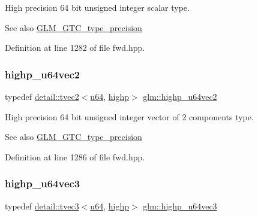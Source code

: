 High precision 64 bit unsigned integer scalar type. \begin{DoxySeeAlso}{See also}
\hyperlink{group__gtc__type__precision}{G\+L\+M\+\_\+\+G\+T\+C\+\_\+type\+\_\+precision} 
\end{DoxySeeAlso}


Definition at line 1282 of file fwd.\+hpp.

\mbox{\label{group__gtc__type__precision_gad11667a4764867732a89791ec2a01aeb}} 
\subsubsection{\texorpdfstring{highp\+\_\+u64vec2}{highp\_u64vec2}}
{\footnotesize\ttfamily typedef \hyperlink{structglm_1_1detail_1_1tvec2}{detail\+::tvec2}$<$\hyperlink{group__gtc__type__precision_ga71cedd4972f9cb1a5e14dfe5ab83ecd7}{u64}, \hyperlink{namespaceglm_a0f04f086094c747d227af4425893f545ac6f7eab42eacbb10d59a58e95e362074}{highp}$>$ \hyperlink{group__gtc__type__precision_gad11667a4764867732a89791ec2a01aeb}{glm\+::highp\+\_\+u64vec2}}

High precision 64 bit unsigned integer vector of 2 components type. \begin{DoxySeeAlso}{See also}
\hyperlink{group__gtc__type__precision}{G\+L\+M\+\_\+\+G\+T\+C\+\_\+type\+\_\+precision} 
\end{DoxySeeAlso}


Definition at line 1286 of file fwd.\+hpp.

\mbox{\label{group__gtc__type__precision_ga3cb5c038f8cba0dfb894af66b7b2ba13}} 
\subsubsection{\texorpdfstring{highp\+\_\+u64vec3}{highp\_u64vec3}}
{\footnotesize\ttfamily typedef \hyperlink{structglm_1_1detail_1_1tvec3}{detail\+::tvec3}$<$\hyperlink{group__gtc__type__precision_ga71cedd4972f9cb1a5e14dfe5ab83ecd7}{u64}, \hyperlink{namespaceglm_a0f04f086094c747d227af4425893f545ac6f7eab42eacbb10d59a58e95e362074}{highp}$>$ \hyperlink{group__gtc__type__precision_ga3cb5c038f8cba0dfb894af66b7b2ba13}{glm\+::highp\+\_\+u64vec3}}

